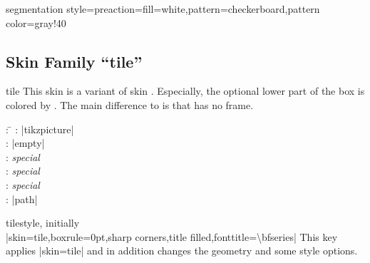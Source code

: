 \begin{dispExample*}{segmentation style={preaction={fill=white},pattern=checkerboard,pattern color=gray!40}}
\end{dispExample*}



\clearpage
\subsection{Skin Family \enquote{tile}}
\begin{docSkin}[doc new=2016-02-25]{tile}
  This skin is a variant of skin . Especially, the
  optional lower part of the box is colored by .
  The main difference to  is that  has no
  frame.
\begin{tcolorbox}[skintable=tile]
  \begin{tabbing}
    : \=\kill
    :  \> |tikzpicture|\\ 
    :           \> |empty|\\
    : \> \emph{special}\\ 
    :        \> \emph{special}\\
    :    \> \emph{special}\\
    :           \> |path|
  \end{tabbing}
\end{tcolorbox}
\end{docSkin}

\begin{docTcbKey}[][doc new=2016-02-25]{tile}{}{style, initially\\
  |skin=tile,boxrule=0pt,sharp corners,title filled,fonttitle=\textbackslash bfseries|
}
  This key applies |skin=tile| and in addition changes the geometry and some style options.
\end{docTcbKey}


\begin{dispExample}
\end{dispExample}


